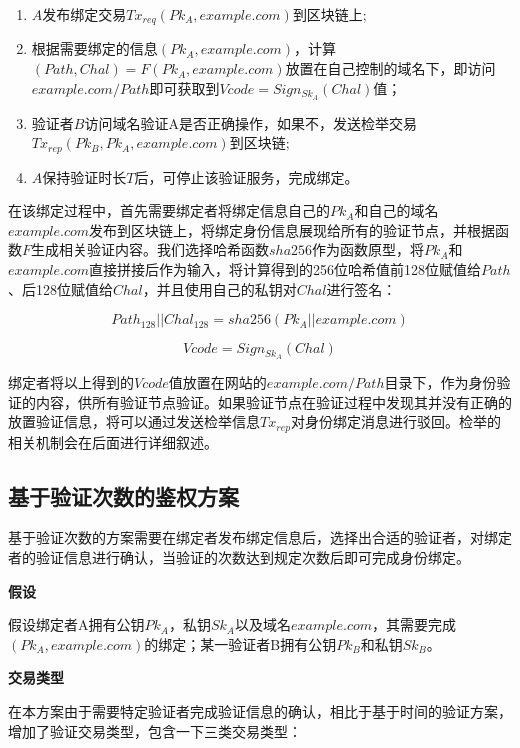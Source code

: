 \begin{enumerate}
	\item $A$发布绑定交易$Tx_{req}(Pk_A, example.com)$到区块链上;
	\item 根据需要绑定的信息$(Pk_A, example.com)$，计算$(Path, Chal) = F(Pk_A, example.com)$放置在自己控制的域名下，即访问$example.com/Path$即可获取到$Vcode = Sign_{Sk_A}(Chal)$值；
	\item 验证者$B$访问域名验证A是否正确操作，如果不，发送检举交易$Tx_{rep}(Pk_B, Pk_A, example.com)$到区块链;
	\item $A$保持验证时长$T$后，可停止该验证服务，完成绑定。
\end{enumerate}


在该绑定过程中，首先需要绑定者将绑定信息自己的$Pk_A$和自己的域名$example.com$发布到区块链上，将绑定身份信息展现给所有的验证节点，并根据函数$F$生成相关验证内容。我们选择哈希函数$sha256$作为函数原型，将$Pk_A$和$example.com$直接拼接后作为输入，将计算得到的256位哈希值前128位赋值给$Path$、后128位赋值给$Chal$，并且使用自己的私钥对$Chal$进行签名：

\begin{equation}\label{eqF}
Path_{128}||Chal_{128} = sha256(Pk_A||example.com)
\end{equation}

\begin{equation}\label{eqSign}
Vcode = Sign_{Sk_A}(Chal)
\end{equation}

绑定者将以上得到的$Vcode$值放置在网站的$example.com/Path$目录下，作为身份验证的内容，供所有验证节点验证。如果验证节点在验证过程中发现其并没有正确的放置验证信息，将可以通过发送检举信息$Tx_{rep}$对身份绑定消息进行驳回。检举的相关机制会在后面进行详细叙述。


\subsection{基于验证次数的鉴权方案}\label{ver_num}

基于验证次数的方案需要在绑定者发布绑定信息后，选择出合适的验证者，对绑定者的验证信息进行确认，当验证的次数达到规定次数后即可完成身份绑定。

\noindent\textbf{假设}

假设绑定者A拥有公钥$Pk_A$，私钥$Sk_A$以及域名$example.com$，其需要完成$(Pk_A, example.com)$的绑定；某一验证者B拥有公钥$Pk_B$和私钥$Sk_B$。

\noindent\textbf{交易类型}

在本方案由于需要特定验证者完成验证信息的确认，相比于基于时间的验证方案，增加了验证交易类型，包含一下三类交易类型：

